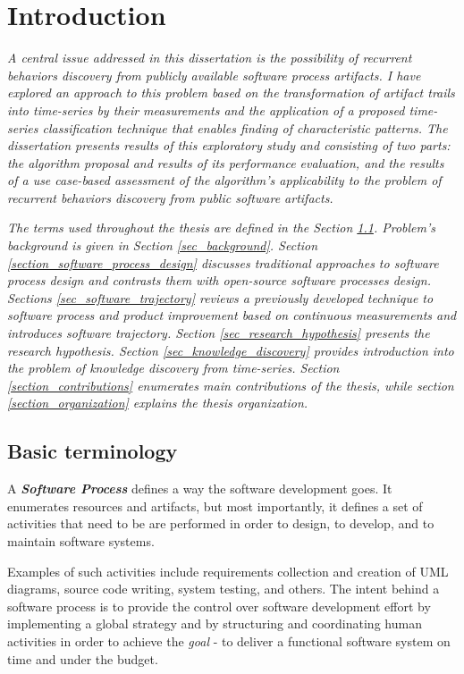\chapter{Introduction}\label{chapter_introduction}
\textit{A central issue addressed in this dissertation is the possibility of recurrent 
behaviors discovery from publicly available software process artifacts. 
I have explored an approach to this problem based on the transformation of artifact trails into 
time-series by their measurements and the application of a proposed time-series classification 
technique that enables finding of characteristic patterns. 
The dissertation presents results of this exploratory study and consisting of two parts: 
the algorithm proposal and results of its performance evaluation, and the results of a 
use case-based assessment of the algorithm's applicability to the problem of recurrent behaviors 
discovery from public software artifacts.}

\textit{The terms used throughout the thesis are defined in the Section \ref{sec_terminology}. 
Problem's background is given in Section \ref{sec_background}. 
Section \ref{section_software_process_design} discusses traditional approaches to software process 
design and contrasts them with open-source software processes design.
Sections \ref{sec_software_trajectory} reviews a previously developed technique to software process 
and product improvement based on continuous measurements and introduces software trajectory.
Section \ref{sec_research_hypothesis} presents the research hypothesis.
Section \ref{sec_knowledge_discovery} provides introduction into the problem of knowledge discovery 
from time-series.
Section \ref{section_contributions} enumerates main contributions of the thesis, 
while section \ref{section_organization} explains the thesis organization.}

\section{Basic terminology}\label{sec_terminology}
\begin{defn}\label{def_process}
A \textbf{\textit{Software Process}} defines a way the software development goes. It enumerates
resources and artifacts, but most importantly, it defines a set of activities that need to be are performed 
in order to design, to develop, and to maintain software systems.
\end{defn}
Examples of such activities include requirements collection and creation of UML diagrams, 
source code writing, system testing, and others. The intent behind a software process is to provide 
the control over software development effort by implementing a global strategy and by structuring
and coordinating human activities in order to achieve the \textit{goal} - to deliver a functional
software system on time and under the budget. 

